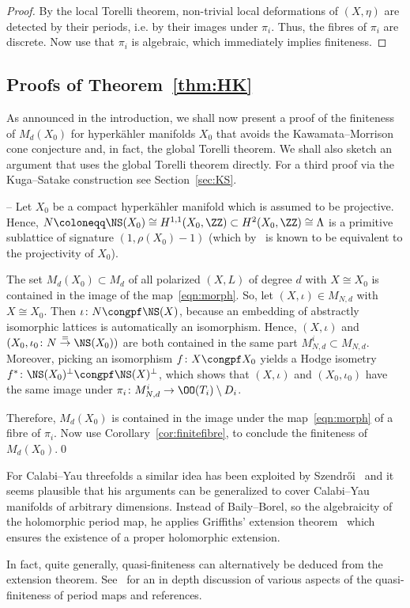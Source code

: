 \begin{proof}
By the local Torelli theorem, non-trivial local deformations of $(X,\eta)$ are detected by their periods, i.e. by their images under $\pi_i$. Thus, the fibres of $\pi_i$ are discrete. Now use that $\pi_i$ is algebraic, which immediately implies finiteness.
\end{proof}


\subsection{Proofs of Theorem~\ref{thm:HK}}\label{sec:proof}
As announced in the introduction, we shall now present a proof of the finiteness of $M_d(X_0)$ for hyperk\"ahler manifolds $X_0$ that avoids the Kawamata--Morrison cone conjecture and, in fact, the global Torelli theorem. We shall also sketch an argument that uses the global Torelli theorem directly. For a third proof via the Kuga--Satake construction see Section~\ref{sec:KS}.

\medskip

-- Let $X_0$ be a compact hyperk\"ahler manifold which is assumed to be projective. Hence, $N\coloneqq \NS(X_0)\cong H^{1,1}(X_0,\ZZ)\subset H^2(X_0,\ZZ)\cong\Lambda$ is a primitive sublattice of signature $(1,\rho(X_0)-1)$ (which by~\cite{HuyHK} is known to be equivalent to the projectivity of $X_0$).

The set $M_d(X_0)\subset {M}_d$ of all polarized $(X,L)$ of degree $d$ with $X\cong X_0$ is contained in the image of the map~\eqref{eqn:morph}. So, let $(X,\iota)\in M_{N,d}$ with $X\cong X_0$. Then $\iota\colon N\congpf \NS(X)$, because an embedding of abstractly isomorphic lattices is automatically an isomorphism. Hence, $(X,\iota)$ and $(X_0,\iota_0\colon N\stackrel{=}{\to}\NS(X_0))$ are both contained in the same part $M^i_{N,d}\subset M_{N,d}$. Moreover, picking an isomorphism $f\colon X\congpf X_0$ yields a Hodge isometry $f^*\colon\NS(X_0)^\perp\congpf \NS(X)^\perp$, which shows that $(X,\iota)$ and $(X_0,\iota_0)$ have the same image under $\pi_i\colon M^i_{N,d}\to \OO(T_i)\setminus D_i$.

Therefore, $M_d(X_0)$ is contained in the image under the map~\eqref{eqn:morph} of a fibre of $\pi_i$. Now use Corollary~\ref{cor:finitefibre}, to conclude the finiteness of $M_d(X_0)$.\qed

\begin{rema}
For Calabi--Yau threefolds a similar idea has been exploited by Szendr\H{o}i~\cite{Szendroi} and it seems plausible that his arguments can be generalized to cover Calabi--Yau manifolds of arbitrary dimensions. Instead of Baily--Borel, so the algebraicity of the holomorphic period map, he applies Griffiths' extension theorem~\cite{CGGH} which ensures the existence of a proper holomorphic extension.

In fact, quite generally, quasi-finiteness can alternatively be deduced from the extension theorem. See~\cite{JL} for an in depth discussion of various aspects of the quasi-finiteness of period maps and references.
\end{rema}

